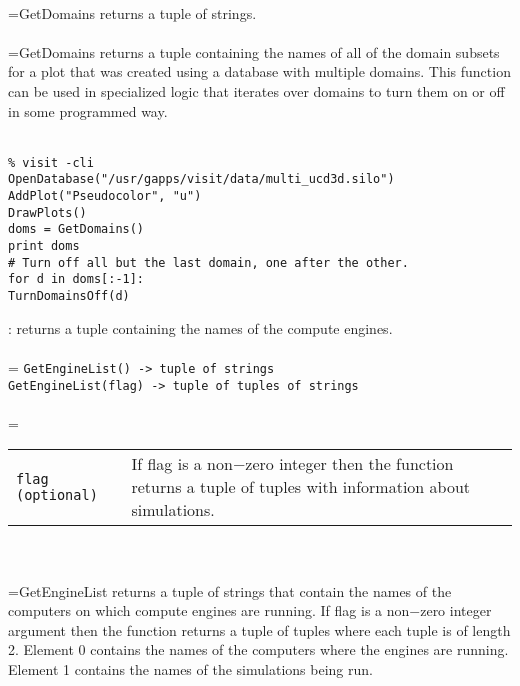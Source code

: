 \documentclass[10pt,a4paper]{report}
\begin{document}
 \\ 
\hangindent=\parindent GetDomains returns a tuple of strings. \\[-3mm] 

 \\ 
\hangindent=\parindent GetDomains returns a tuple containing the names of all of the domain subsets for a plot that was created using a database with multiple domains. This function can be used in specialized logic that iterates over domains to turn them on or off in some programmed way. \\[-3mm] 

\\[-6mm]
\begin{verbatim}% visit -cli
OpenDatabase("/usr/gapps/visit/data/multi_ucd3d.silo")
AddPlot("Pseudocolor", "u")
DrawPlots()
doms = GetDomains()
print doms
# Turn off all but the last domain, one after the other.
for d in doms[:-1]:
TurnDomainsOff(d)
\end{verbatim}
\newpage


{}
: returns a tuple containing the names of the compute engines.\\[-3mm]

 \\ 
\hangindent=\parindent 
\verb!GetEngineList() -> tuple of strings!\\ 
\verb!GetEngineList(flag) -> tuple of tuples of strings!\\ [-3mm]

 \\ 
\hangindent=\parindent 
\begin{tabular}{lp{9cm}}
\verb!flag (optional)! & If flag is a non$-$zero integer then the function returns a tuple of tuples with information about simulations. \\
\end{tabular} \\[-2mm]


 \\ 
\hangindent=\parindent GetEngineList returns a tuple of strings that contain the names of the computers on which compute engines are running. If flag is a non$-$zero integer argument then the function returns a tuple of tuples where each tuple is of length 2. Element 0 contains the names of the computers where the engines are running. Element 1 contains the names of the simulations being run. \\[-3mm] 
\end{document}
